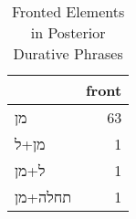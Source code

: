 \begin{table}[htbp!]
\centering
\caption{Fronted Elements in Posterior Durative Phrases}
\label{table:postdur_front}
\begin{tabular}{lr}
\toprule
{} &  front \\
\midrule
\texthebrew{מן}                   &     63 \\
\texthebrew{מן}+\texthebrew{ל}    &      1 \\
\texthebrew{ל}+\texthebrew{מן}    &      1 \\
\texthebrew{תחלה}+\texthebrew{מן} &      1 \\
\bottomrule
\end{tabular}
\end{table}
